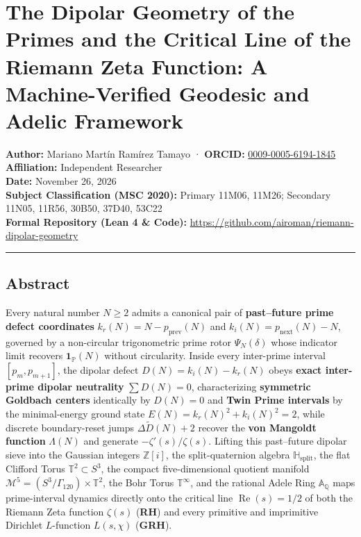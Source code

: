 \documentclass[
  11pt,
]{article}
\author{}
\date{}
\begin{document}
\section{The Dipolar Geometry of the Primes and the Critical Line of the
Riemann Zeta Function: A Machine-Verified Geodesic and Adelic
Framework}\label{the-dipolar-geometry-of-the-primes-and-the-critical-line-of-the-riemann-zeta-function-a-machine-verified-geodesic-and-adelic-framework}

\textbf{Author:} Mariano Martín Ramírez Tamayo · \textbf{ORCID:}
\href{https://orcid.org/0009-0005-6194-1845}{0009-0005-6194-1845}\\
\textbf{Affiliation:} Independent Researcher\\
\textbf{Date:} November 26, 2026\\
\textbf{Subject Classification (MSC 2020):} Primary 11M06, 11M26;
Secondary 11N05, 11R56, 30B50, 37D40, 53C22\\
\textbf{Formal Repository (Lean 4 \& Code):}
\url{https://github.com/airoman/riemann-dipolar-geometry}

\begin{center}\rule{0.5\linewidth}{0.5pt}\end{center}

\subsection{Abstract}\label{abstract}

Every natural number \(N \ge 2\) admits a canonical pair of
\textbf{past--future prime defect coordinates}
\(k_r(N) = N - p_{\text{prev}}(N)\) and
\(k_i(N) = p_{\text{next}}(N) - N\), governed by a non-circular
trigonometric prime rotor \(\Psi_N(\delta)\) whose indicator limit
recovers \(\mathbf{1}_{\mathbb{P}}(N)\) without circularity. Inside
every inter-prime interval \([p_m, p_{m+1}]\), the dipolar defect
\(D(N) = k_i(N) - k_r(N)\) obeys \textbf{exact inter-prime dipolar
neutrality} \(\sum D(N) = 0\), characterizing \textbf{symmetric Goldbach
centers} identically by \(D(N) = 0\) and \textbf{Twin Prime intervals}
by the minimal-energy ground state \(E(N) = k_r(N)^2 + k_i(N)^2 = 2\),
while discrete boundary-reset jumps \(\Delta\widetilde{D}(N) + 2\)
recover the \textbf{von Mangoldt function} \(\Lambda(N)\) and generate
\(-\zeta'(s)/\zeta(s)\). Lifting this past--future dipolar sieve into
the Gaussian integers \(\mathbb{Z}[i]\), the split-quaternion algebra
\(\mathbb{H}_{\text{split}}\), the flat Clifford Torus
\(\mathbb{T}^2 \subset S^3\), the compact five-dimensional quotient
manifold \(\mathcal{M}^5 = (S^3/\Gamma_{120}) \times \mathbb{T}^2\), the
Bohr Torus \(\mathbb{T}^\infty\), and the rational Adele Ring
\(\mathbb{A}_{\mathbb{Q}}\) maps prime-interval dynamics directly onto
the critical line \(\operatorname{Re}(s) = 1/2\) of both the Riemann
Zeta function \(\zeta(s)\) (\textbf{RH}) and every primitive and
imprimitive Dirichlet \(L\)-function \(L(s, \chi)\) (\textbf{GRH}).
\end{document}
